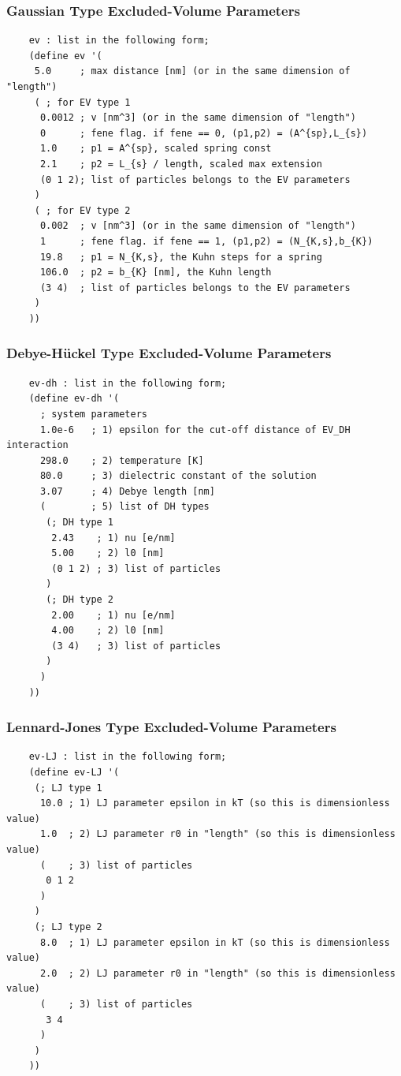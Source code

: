 \documentclass{book}
\begin{document}
\subsubsection{Gaussian Type Excluded-Volume Parameters}
{\small
\begin{verbatim}
	ev : list in the following form;
	(define ev '(
	 5.0     ; max distance [nm] (or in the same dimension of "length")
	 ( ; for EV type 1
	  0.0012 ; v [nm^3] (or in the same dimension of "length")
	  0      ; fene flag. if fene == 0, (p1,p2) = (A^{sp},L_{s})
	  1.0    ; p1 = A^{sp}, scaled spring const
	  2.1    ; p2 = L_{s} / length, scaled max extension
	  (0 1 2); list of particles belongs to the EV parameters
	 )
	 ( ; for EV type 2
	  0.002  ; v [nm^3] (or in the same dimension of "length")
	  1      ; fene flag. if fene == 1, (p1,p2) = (N_{K,s},b_{K})
	  19.8   ; p1 = N_{K,s}, the Kuhn steps for a spring
	  106.0  ; p2 = b_{K} [nm], the Kuhn length
	  (3 4)  ; list of particles belongs to the EV parameters
	 )
	))
\end{verbatim}
}

\subsubsection{Debye-H\"{u}ckel Type Excluded-Volume Parameters}
{\small
\begin{verbatim}
	ev-dh : list in the following form;
	(define ev-dh '(
	  ; system parameters
	  1.0e-6   ; 1) epsilon for the cut-off distance of EV_DH interaction
	  298.0    ; 2) temperature [K]
	  80.0     ; 3) dielectric constant of the solution
	  3.07     ; 4) Debye length [nm]
	  (        ; 5) list of DH types
	   (; DH type 1
	    2.43    ; 1) nu [e/nm]
	    5.00    ; 2) l0 [nm]
	    (0 1 2) ; 3) list of particles
	   )
	   (; DH type 2
	    2.00    ; 1) nu [e/nm]
	    4.00    ; 2) l0 [nm]
	    (3 4)   ; 3) list of particles
	   )
	  )
	))
\end{verbatim}
}

\subsubsection{Lennard-Jones Type Excluded-Volume Parameters}
{\small
\begin{verbatim}
	ev-LJ : list in the following form;
	(define ev-LJ '(
	 (; LJ type 1
	  10.0 ; 1) LJ parameter epsilon in kT (so this is dimensionless value)
	  1.0  ; 2) LJ parameter r0 in "length" (so this is dimensionless value)
	  (    ; 3) list of particles
	   0 1 2
	  )
	 )
	 (; LJ type 2
	  8.0  ; 1) LJ parameter epsilon in kT (so this is dimensionless value)
	  2.0  ; 2) LJ parameter r0 in "length" (so this is dimensionless value)
	  (    ; 3) list of particles
	   3 4
	  )
	 )
	))
\end{verbatim}
}
\end{document}
